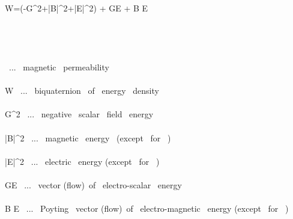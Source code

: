 \mu  \widehat W=(-G^2+|\vec B|^2+|\vec E|^2) +\imath {} G\vec E +\imath {} \vec B \times \vec E \\\\\\

\\\\

\mu \ ... \ magnetic \ permeability \\\\
\widehat W \ ... \ biquaternion \ of \ energy \ density \\\\
G^2 \ ... \  negative \ scalar \ field \ energy \\\\
|\vec B|^2 \ ... \ magnetic \ energy \ (except \ for \ \mu) \\\\
|\vec E|^2 \ ... \ electric \ energy (except \ for \ \mu) \\\\
 G\vec E \ ... \ vector (flow)\ of \ electro-scalar \ energy \\\\
 \vec B \times \vec E \ ... \ Poyting \ vector (flow)\ of \ electro-magnetic \ energy (except \ for \ \mu)
